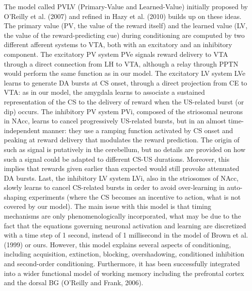 \documentclass[
  11pt,
  a4paper,
]{scrbook}
\begin{document}
The model called PVLV (Primary-Value and Learned-Value) initially
proposed by O'Reilly et al. (2007) and refined in Hazy et al. (2010)
builds up on these ideas. The primary value (PV, the value of the reward
itself) and the learned value (LV, the value of the reward-predicting
cue) during conditioning are computed by two different afferent systems
to VTA, both with an excitatory and an inhibitory component. The
excitatory PV system PVe signals reward delivery to VTA through a direct
connection from LH to VTA, although a relay through PPTN would perform
the same function as in our model. The excitatory LV system LVe learns
to generate DA bursts at CS onset, through a direct projection from CE
to VTA: as in our model, the amygdala learns to associate a sustained
representation of the CS to the delivery of reward when the US-related
burst (or dip) occurs. The inhibitory PV system PVi, composed of the
striosomal neurons in NAcc, learns to cancel progressively US-related
bursts, but in an almost time-independent manner: they use a ramping
function activated by CS onset and peaking at reward delivery that
modulates the reward prediction. The origin of such as signal is
putatively in the cerebellum, but no details are provided on how such a
signal could be adapted to different CS-US durations. Moreover, this
implies that rewards given earlier than expected would still provoke
attenuated DA bursts. Last, the inhibitory LV system LVi, also in the
striosomes of NAcc, slowly learns to cancel CS-related bursts in order
to avoid over-learning in auto-shaping experiments (where the CS becomes
an incentive to action, what is not covered by our model). The main
issue with this model is that timing mechanisms are only
phenomenologically incorporated, what may be due to the fact that the
equations governing neuronal activation and learning are discretized
with a time step of 1 second, instead of 1 millisecond in the model of
Brown et al. (1999) or ours. However, this model explains several
aspects of conditioning, including acquisition, extinction, blocking,
overshadowing, conditioned inhibition and second-order conditioning.
Furthermore, it has been successfully integrated into a wider functional
model of working memory including the prefrontal cortex and the dorsal
BG (O'Reilly and Frank, 2006).
\end{document}
